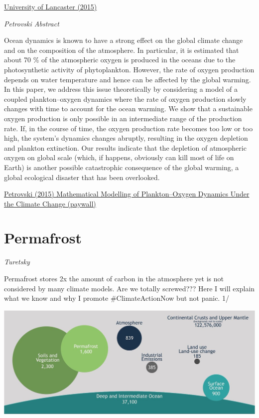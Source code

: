 \documentclass[
]{book}
\begin{document}
\href{https://www.sciencedaily.com/releases/2015/12/151201094120.htm}{University of Lancaster (2015)}

\emph{Petrovski Abstract}

Ocean dynamics is known to have a strong effect on the global climate change and on the composition of the atmosphere. In particular, it is estimated that about 70 \% of the atmospheric oxygen is produced in the oceans due to the photosynthetic activity of phytoplankton. However, the rate of oxygen production depends on water temperature and hence can be affected by the global warming. In this paper, we address this issue theoretically by considering a model of a coupled plankton--oxygen dynamics where the rate of oxygen production slowly changes with time to account for the ocean warming. We show that a sustainable oxygen production is only possible in an intermediate range of the production rate. If, in the course of time, the oxygen production rate becomes too low or too high, the system's dynamics changes abruptly, resulting in the oxygen depletion and plankton extinction. Our results indicate that the depletion of atmospheric oxygen on global scale (which, if happens, obviously can kill most of life on Earth) is another possible catastrophic consequence of the global warming, a global ecological disaster that has been overlooked.

\href{https://link.springer.com/article/10.1007/s11538-015-0126-0}{Petrovski (2015) Mathematical Modelling of Plankton--Oxygen Dynamics Under the Climate Change (paywall)}

\hypertarget{permafrost}{%
\chapter{Permafrost}\label{permafrost}}

\emph{Turetsky}

Permafrost stores 2x the amount of carbon in the atmosphere yet is not considered by many climate models. Are we totally screwed??? Here I will explain what we know and why I promote \#ClimateActionNow but not panic. 1/

\includegraphics{fig/permafrost_storage.jpg}
\end{document}
